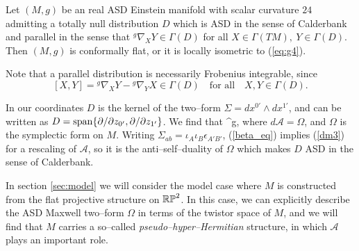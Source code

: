 \begin{theo}\cite{DM} \label{thm:DMcharacterisation}
Let $(M,g)$ be an real ASD Einstein manifold with scalar curvature $24$ admitting a totally null distribution $D$ which is ASD in the sense of Calderbank and parallel in the sense that $^g\nabla_XY\in\Gamma(D)$ for all $X\in \Gamma(TM),\ Y\in\Gamma(D)$. Then $(M,g)$ is conformally flat, or it is locally isometric to (\ref{eq:g4}).
\end{theo}
\noindent
Note that a parallel distribution is necessarily Frobenius integrable, since
\[
[X,Y]= {^g}\nabla_XY- {^g}\nabla_YX\in\Gamma(D)\quad\mbox{for all}\quad X,Y\in\Gamma(D).
\]

In our coordinates $D$ is the kernel of the two--form $\Sigma=dx^{0'}\wedge dx^{1'}$, and can be written as ${D}=\mathrm{span}\{\partial/\partial z_{0'},\partial/\partial z_{1'}\}$. We find that
\be
\label{beta_eq}
^g\nabla{}\otimes \Sigma,
\ee
where $d\mathcal{A}=\Omega$, and $\Omega$ is the symplectic form on $M$. Writing $\Sigma_{ab}=\iota_A\iota_B\epsilon_{A'B'}$, (\ref{beta_eq}) implies (\ref{dm3}) for a rescaling of $\mathcal{A}$, so it is the anti--self--duality of $\Omega$ which makes $D$ ASD in the sense of Calderbank. 

In section \ref{sec:model} we will consider the model case where $M$ is constructed from the flat projective structure on $\mathbb{RP}^2$. In this case, we can explicitly describe the ASD Maxwell two--form $\Omega$ in terms of the twistor space of $M$,
and we will find that $M$ carries a so--called \textit{pseudo--hyper--Hermitian} structure, in which $\mathcal{A}$ plays an important role.












